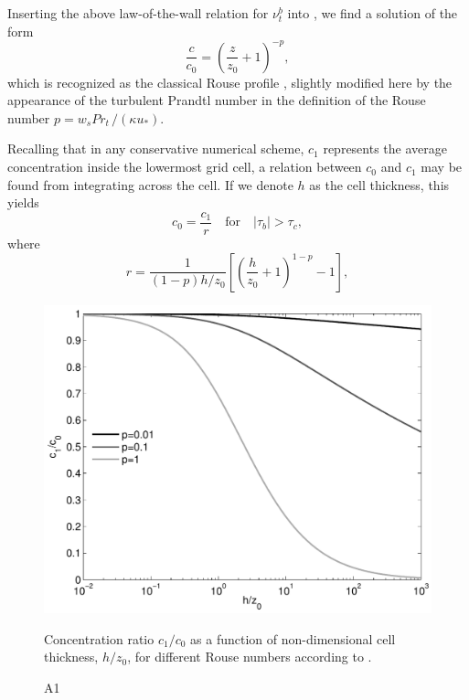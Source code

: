 Inserting the above law-of-the-wall relation for $\nu_t^b$ into
, we find a solution of the form
\begin{equation}
 \label{Rouse}
 \dfrac{c}{c_0} = \left( \frac{z}{z_0} + 1 \right)^{-p} \comma
\end{equation}
which is recognized as the classical Rouse profile
\citep{vanRijn84b}, slightly modified here by the appearance of the
turbulent Prandtl number in the definition of the Rouse number $p =
w_sPr_t \, / (\kappa u_\ast)$.

Recalling that in any conservative numerical scheme, $c_1$ represents
the average concentration inside the lowermost grid cell, a relation
between $c_0$ and $c_1$ may be found from integrating 
across the cell. If we denote $h$ as the cell thickness, this yields
\begin{equation}
 \label{cbot}
 c_0 = \frac{c_1}{r} \quad \text{for} \quad |\tau_b|>\tau_c \comma
\end{equation}
where 
\begin{equation}
 \label{rr}
 r =  \frac{1}{(1-p) h/z_0} \left[ \left( \frac{h}{z_0} + 1 \right)^{1-p} -1 \right] 
 \comma
\end{equation}
\begin{figure}[h]
  \noindent\includegraphics[width=29pc,angle=0]{bilder/rouse.pdf}\\
  \caption{A1}{Concentration ratio $c_1/c_0$ as a function of
    non-dimensional cell thickness, $h/z_0$, for different Rouse
    numbers according to .\label{c0c1}}
\end{figure}
